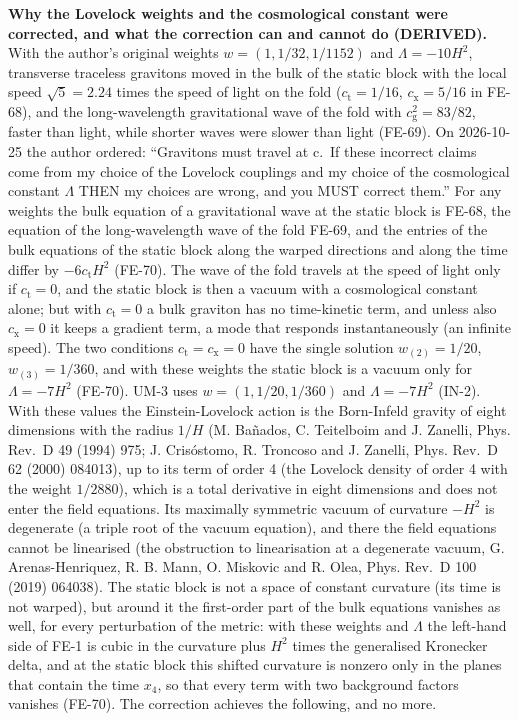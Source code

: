 \documentclass[
  10pt,
]{article}
\begin{document}
\textbf{Why the Lovelock weights and the cosmological constant were
corrected, and what the correction can and cannot do (DERIVED).} With
the author's original weights \(w = (1, 1/32, 1/1152)\) and
\(\Lambda = -10H^2\), transverse traceless gravitons moved in the bulk
of the static block with the local speed \(\sqrt5 = 2.24\) times the
speed of light on the fold (\(c_{\mathrm{t}} = 1/16\),
\(c_{\mathrm{x}} = 5/16\) in FE-68), and the long-wavelength
gravitational wave of the fold with \(c_{\mathrm{g}}^2 = 83/82\), faster
than light, while shorter waves were slower than light (FE-69). On
2026-10-25 the author ordered: ``Gravitons must travel at c.~If these
incorrect claims come from my choice of the Lovelock couplings and my
choice of the cosmological constant \(\Lambda\) THEN my choices are
wrong, and you MUST correct them.'' For any weights the bulk equation of
a gravitational wave at the static block is FE-68, the equation of the
long-wavelength wave of the fold FE-69, and the entries of the bulk
equations of the static block along the warped directions and along the
time differ by \(-6c_{\mathrm{t}}H^2\) (FE-70). The wave of the fold
travels at the speed of light only if \(c_{\mathrm{t}} = 0\), and the
static block is then a vacuum with a cosmological constant alone; but
with \(c_{\mathrm{t}} = 0\) a bulk graviton has no time-kinetic term,
and unless also \(c_{\mathrm{x}} = 0\) it keeps a gradient term, a mode
that responds instantaneously (an infinite speed). The two conditions
\(c_{\mathrm{t}} = c_{\mathrm{x}} = 0\) have the single solution
\(w_{(2)} = 1/20\), \(w_{(3)} = 1/360\), and with these weights the
static block is a vacuum only for \(\Lambda = -7H^2\) (FE-70). UM-3 uses
\(w = (1, 1/20, 1/360)\) and \(\Lambda = -7H^2\) (IN-2). With these
values the Einstein-Lovelock action is the Born-Infeld gravity of eight
dimensions with the radius \(1/H\) (M. Bañados, C. Teitelboim and J.
Zanelli, Phys. Rev.~D 49 (1994) 975; J. Crisóstomo, R. Troncoso and J.
Zanelli, Phys. Rev.~D 62 (2000) 084013), up to its term of order 4 (the
Lovelock density of order 4 with the weight \(1/2880\)), which is a
total derivative in eight dimensions and does not enter the field
equations. Its maximally symmetric vacuum of curvature \(-H^2\) is
degenerate (a triple root of the vacuum equation), and there the field
equations cannot be linearised (the obstruction to linearisation at a
degenerate vacuum, G. Arenas-Henriquez, R. B. Mann, O. Miskovic and R.
Olea, Phys. Rev.~D 100 (2019) 064038). The static block is not a space
of constant curvature (its time is not warped), but around it the
first-order part of the bulk equations vanishes as well, for every
perturbation of the metric: with these weights and \(\Lambda\) the
left-hand side of FE-1 is cubic in the curvature plus \(H^2\) times the
generalised Kronecker delta, and at the static block this shifted
curvature is nonzero only in the planes that contain the time \(x_4\),
so that every term with two background factors vanishes (FE-70). The
correction achieves the following, and no more.
\end{document}
